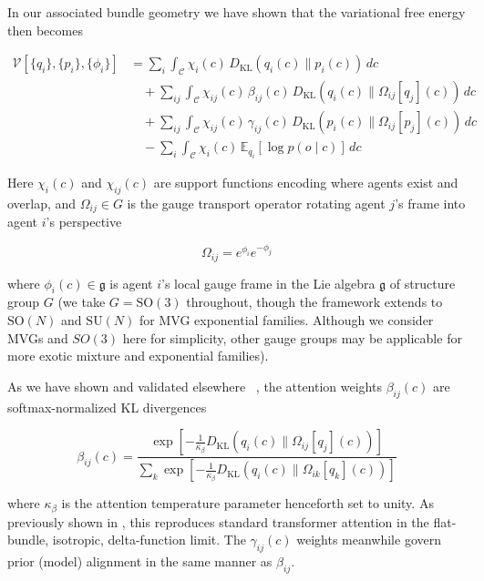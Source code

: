 \documentclass[11pt]{article}
\begin{document}
In our associated bundle geometry we have shown that the variational free energy then becomes

\begin{equation}
\boxed{
\begin{aligned}
\mathcal{V}[\{q_i\}, \{p_i\}, \{\phi_i\}] 
&= \sum_i \int_{\mathcal{C}} \chi_i(c) \, D_{\mathrm{KL}}(q_i(c) \| p_i(c)) \, dc \\[4pt]
&\quad + \sum_{ij} \int_{\mathcal{C}} \chi_{ij}(c) \, \beta_{ij}(c) \, D_{\mathrm{KL}}(q_i(c) \| \Omega_{ij}[q_j](c)) \, dc \\[4pt]
&\quad + \sum_{ij} \int_{\mathcal{C}} \chi_{ij}(c) \, \gamma_{ij}(c) \, D_{\mathrm{KL}}(p_i(c) \| \Omega_{ij}[p_j](c)) \, dc \\[4pt]
&\quad - \sum_i \int_{\mathcal{C}} \chi_i(c) \, \mathbb{E}_{q_i}[\log p(o \mid c)] \, dc
\end{aligned}
}
\label{eq:free_energy_functional}
\end{equation}

Here $\chi_i(c)$ and $\chi_{ij}(c)$ are support functions encoding where agents exist and overlap, and $\Omega_{ij} \in G$ is the gauge transport operator rotating agent $j$'s frame into agent $i$'s perspective

\begin{equation}
\Omega_{ij} = e^{\phi_i} e^{-\phi_j}
\end{equation}

where $\phi_i(c) \in \mathfrak{g}$ is agent $i$'s local gauge frame in the Lie algebra $\mathfrak{g}$ of structure group $G$ (we take $G = \mathrm{SO}(3)$ throughout, though the framework extends to $\mathrm{SO}(N)$ and $\mathrm{SU}(N)$ for MVG exponential families.  Although we consider MVGs and $SO(3)$ here for simplicity, other gauge groups may be applicable for more exotic mixture and exponential families).

As we have shown and validated elsewhere ~\cite{Dennis2025}, the attention weights $\beta_{ij}(c)$ are softmax-normalized KL divergences

\begin{equation}
\beta_{ij}(c) = \frac{\exp\left[-\frac{1}{\kappa_\beta} D_{\mathrm{KL}}(q_i(c) \| \Omega_{ij}[q_j](c))\right]}{\sum_{k} \exp\left[-\frac{1}{\kappa_\beta} D_{\mathrm{KL}}(q_i(c) \| \Omega_{ik}[q_k](c))\right]}
\label{eq:attention}
\end{equation}

where $\kappa_\beta$ is the attention temperature parameter henceforth set to unity. As previously shown in \cite{Dennis2025}, this reproduces standard transformer attention in the flat-bundle, isotropic, delta-function limit. The $\gamma_{ij}(c)$ weights meanwhile govern prior (model) alignment in the same manner as $\beta_{ij}$.
\end{document}
